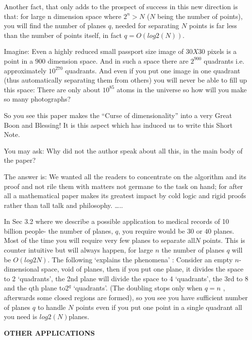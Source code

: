 \documentclass[english]{article}
\begin{document}
Another fact, that only adds to the prospect of success in this new
direction is that: for large n dimension space where $2^{n}>N$ ($N$
being the number of points), you will find the number of planes $q$,
needed for separating $N$ points is far less than the number of points
itself, in fact $q=O(log2(N)).$

Imagine: Even a highly reduced small passport size image of $30X30$
pixels is a point in a $900$ dimension space. And in such a space
there are $2^{900}$ quadrants i.e. approximately $10^{270}$ quadrants.
And even if you put one image in one quadrant (thus automatically
separating them from others) you will never be able to fill up this
space: There are only about $10^{85}$ atoms in the universe so how
will you make so many photographs?

So you see this paper makes the {}``Curse of dimensionality'' into
a very Great Boon and Blessing! It is this aspect which has induced us to
 write this Short Note.

You may ask: Why did not the author speak about all this, in the main
body of the paper?

The answer is: We wanted all the readers to concentrate on the algorithm
and its proof and not rile them with matters not germane to the task
on hand; for after all a mathematical paper makes its greatest impact
by cold logic and rigid proofs rather than tall talk and philosophy.
\ldots{}.. 

In Sec 3.2 where we describe a possible application to medical records
of 10 billion people- the number of planes, $q$, you require would
be $30$ or $40$ planes. Most of the time you will require very few
planes to separate all$N$ points. This is counter intuitive but will
always happen, for large $n$ the number of planes $q$ will be $O(log2N)$.
The following `explains the phenomena\textquoteright{} : Consider
an empty $n$-dimensional space, void of planes, then if you put one
plane, it divides the space to 2 `quadrants\textquoteright{}, the
2nd plane will divide the space to 4 `quadrants\textquoteright{},
the 3rd to 8 and the qth plane to$2^{q}$ `quadrants\textquoteright{}.
(The doubling stops only when $q=n$ , afterwards some closed regions
are formed), so you see you have sufficient number of planes $q$
to handle $N$ points even if you put one point in a single quadrant
all you need is $log2(N)$planes.

\medskip{}


\textbf{\large OTHER APPLICATIONS }{\large \par}
\end{document}
